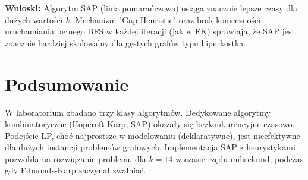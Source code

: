 \documentclass[a4paper,12pt]{article}
\begin{document}
\textbf{Wnioski:}
Algorytm SAP (linia pomarańczowa) osiąga znacznie lepsze czasy dla dużych wartości $k$. Mechanizm "Gap Heuristic" oraz brak konieczności uruchamiania pełnego BFS w każdej iteracji (jak w EK) sprawiają, że SAP jest znacznie bardziej skalowalny dla gęstych grafów typu hiperkostka.

\section{Podsumowanie}
W laboratorium zbadano trzy klasy algorytmów. Dedykowane algorytmy kombinatoryczne (Hopcroft-Karp, SAP) okazały się bezkonkurencyjne czasowo. Podejście LP, choć najprostsze w modelowaniu (deklaratywne), jest nieefektywne dla dużych instancji problemów grafowych. Implementacja SAP z heurystykami pozwoliła na rozwiązanie problemu dla $k=14$ w czasie rzędu milisekund, podczas gdy Edmonds-Karp zaczynał zwalniać.
\end{document}
